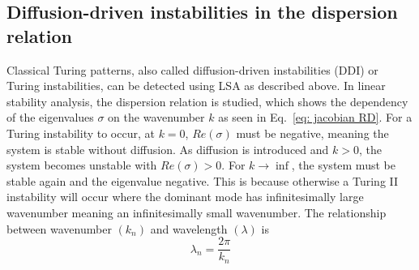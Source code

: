 




\subsection{Diffusion-driven instabilities in the dispersion relation}
Classical Turing patterns, also called diffusion-driven instabilities (DDI) or Turing instabilities, can be detected using LSA as described above.
In linear stability analysis, the dispersion relation is studied, which shows the dependency of the eigenvalues $\sigma$ on the wavenumber $k$ as seen in Eq.~\ref{eq: jacobian RD}.
For a Turing instability to occur, at $k=0$, $Re(\sigma)$ must be negative, meaning the system is stable without diffusion.
As diffusion is introduced and $k>0$, the system becomes unstable with $Re(\sigma)>0$.
For $k \rightarrow \inf$, the system must be stable again and the eigenvalue negative.
This is because otherwise a Turing II instability will occur where the dominant mode has infinitesimally large wavenumber meaning an infinitesimally small wavenumber.
The relationship between wavenumber $(k_{n})$ and wavelength $(\lambda)$ is
\begin{equation}
    \lambda_n = \frac{2 \pi}{k_n}
    \label{eq:wavelength_wavenumber}
\end{equation}
